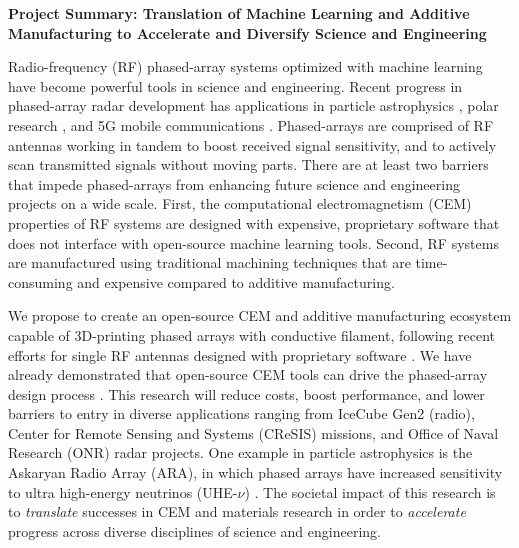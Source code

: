 \documentclass[../../main.tex]{subfiles}
\begin{document}
\textbf{Project Summary: Translation of Machine Learning and Additive Manufacturing to Accelerate and Diversify Science and Engineering} \\ \vspace{2.5mm}

Radio-frequency (RF) phased-array systems optimized with machine learning have become powerful tools in science and engineering.  Recent progress in phased-array radar development has applications in particle astrophysics \cite{Vieregg_2016,AVVA201746,electronics10040415,Aguilar_2021}, polar research \cite{arnold_2020,9670670}, and 5G mobile communications \cite{5G_review_paper}.  Phased-arrays are comprised of RF antennas working in tandem to boost received signal sensitivity, and to actively scan transmitted signals without moving parts.  There are at least two barriers that impede phased-arrays from enhancing future science and engineering projects on a wide scale.  First, the computational electromagnetism (CEM) properties of RF systems are designed with expensive, proprietary software that does not interface with open-source machine learning tools.  Second, RF systems are manufactured using traditional machining techniques that are time-consuming and expensive compared to additive manufacturing. \\ \vspace{2.5mm}

We propose to create an open-source CEM and additive manufacturing ecosystem capable of 3D-printing phased arrays with conductive filament, following recent efforts for single RF antennas designed with proprietary software \cite{8786183,yurduseven,10.3390/electronics8121506}.  We have already demonstrated that open-source CEM tools can drive the phased-array design process \cite{electronics10040415,meepcon2022,10.1016/j.cpc.2009.11.008}.  This research will reduce costs, boost performance, and lower barriers to entry in diverse applications ranging from IceCube Gen2 (radio), Center for Remote Sensing and Systems (CReSIS) missions, and Office of Naval Research (ONR) radar projects.  One example in particle astrophysics is the Askaryan Radio Array (ARA), in which phased arrays have increased sensitivity to ultra high-energy neutrinos (UHE-$\nu$) \cite{PhysRevD.105.122006}.  The societal impact of this research is to \textit{translate} successes in CEM and materials research in order to \textit{accelerate} progress across diverse disciplines of science and engineering. \\ \vspace{2.5mm}
\end{document}

